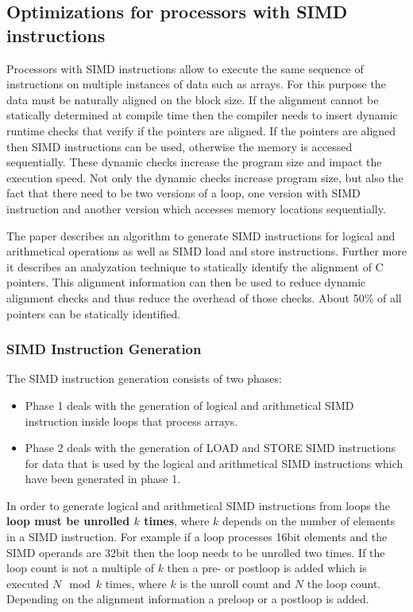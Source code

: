 \documentclass[a4paper,10pt]{article}
\begin{document}
\subsection{Optimizations for processors with SIMD instructions}
Processors with SIMD instructions allow to execute the same sequence of instructions on multiple instances of data such as arrays. For
this purpose the data must be naturally aligned on the block size. If the alignment cannot be statically determined at compile time
then the compiler needs to insert dynamic runtime checks that verify if the pointers are aligned. If the pointers are aligned then
SIMD instructions can be used, otherwise the memory is accessed sequentially. These dynamic checks increase the program size and impact 
the execution speed. Not only the dynamic checks increase program size, but also the fact that there need to be two versions of a loop,
one version with SIMD instruction and another version which accesses memory locations sequentially.

The paper describes an algorithm to generate SIMD instructions for logical and arithmetical operations as well as SIMD load and
store instructions. Further more it describes an analyzation technique to statically identify the alignment of C pointers. 
This alignment information can then be used to reduce dynamic alignment checks and thus reduce the overhead of those checks. 
About 50\% of all pointers can be statically identified.

\subsubsection{SIMD Instruction Generation}
The SIMD instruction generation consists of two phases:
\begin{itemize}
 \item Phase 1 deals with the generation of logical and arithmetical SIMD instruction inside loops that process arrays.
 \item Phase 2 deals with the generation of LOAD and STORE SIMD instructions for data that is used by the logical and arithmetical SIMD 
       instructions which have been generated in phase 1.
\end{itemize}

In order to generate logical and arithmetical SIMD instructions from loops the \textbf{loop must be unrolled $k$ times}, where $k$ 
depends on the number of elements in a SIMD instruction. For example if a loop processes 16bit elements and the SIMD operands are 32bit
then the loop needs to be unrolled two times. If the loop count is not a multiple of $k$ then a pre- or postloop is added which is 
executed $N \mod k$ times, where $k$ is the unroll count and $N$ the loop count. Depending on the alignment information a preloop or
a postloop is added.
\end{document}
